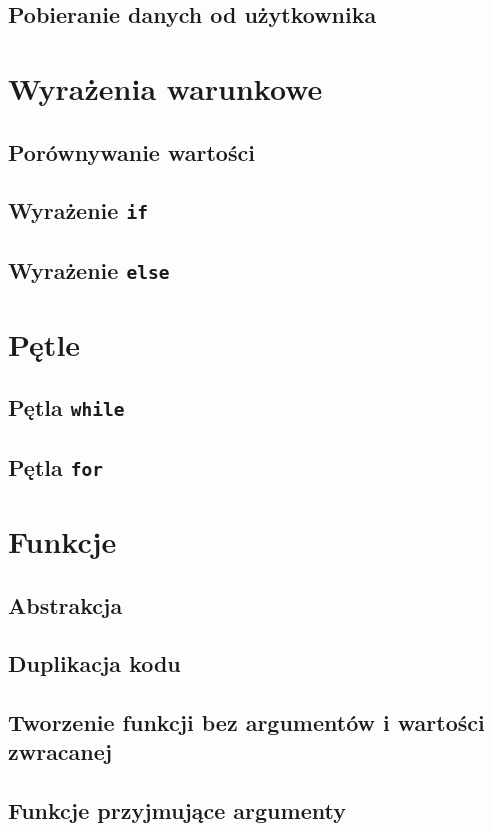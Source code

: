 \documentclass[11pt]{book}
\begin{document}
\section{Pobieranie danych od użytkownika}

\chapter{Wyrażenia warunkowe}
\section{Porównywanie wartości}
\section{Wyrażenie \texttt{if}}
\section{Wyrażenie \texttt{else}}

\chapter{Pętle}
\section{Pętla \texttt{while}}
\section{Pętla \texttt{for}}

\chapter{Funkcje}
\section{Abstrakcja}
\section{Duplikacja kodu}
\section{Tworzenie funkcji bez argumentów i wartości zwracanej}
\section{Funkcje przyjmujące argumenty}
\end{document}
